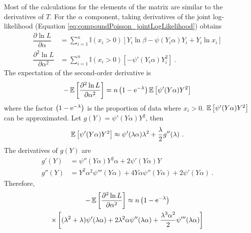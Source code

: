 Most of the calculations for the elements of the matrix are similar to the derivatives of $T$. For the $\alpha$ component, taking derivatives of the joint log-likelihood (Equation \eqref{eq:compoundPoisson_jointLogLikelihood}) obtains
\begin{align}
\dfrac{\partial\ln L}{\partial\alpha} &= \sum_{i=1}^n\mathbb{I}(x_i>0)
\left[
  Y_i\ln\beta - \psi(Y_i\alpha)Y_i+Y_i\ln x_i
\right]
\\
\dfrac{\partial^2\ln L}{\partial\alpha^2} &= \sum_{i=1}^n\mathbb{I}(x_i>0)
\left[
  -\psi'(Y_i\alpha)Y_i^2
\right] \ .
\end{align}
The expectation of the second-order derivative is
\begin{equation}
-\operatorname{\mathbb{E}}\left[\dfrac{\partial^2\ln L}{\partial\alpha^2}\right]
=
n\left(1-\mathrm{e}^{-\lambda}\right)
\operatorname{\mathbb{E}}\left[
  \psi'(Y\alpha)Y^2
\right]
\end{equation}
where the factor $\left(1-\mathrm{e}^{-\lambda}\right)$ is the proportion of data where $x_i>0$. $\operatorname{\mathbb{E}}\left[\psi'(Y\alpha)Y^2\right]$ can be approximated. Let $g(Y)=\psi'(Y\alpha)Y^2$, then
\begin{equation}
\operatorname{\mathbb{E}}\left[\psi'(Y\alpha)Y^2\right]
\approx
\psi'(\lambda\alpha)\lambda^2
+\dfrac{\lambda}{2}g''(\lambda) \ .
\end{equation}
The derivatives of $g(Y)$ are
\begin{align}
g'(Y)&=\psi''(Y\alpha)Y^2\alpha + 2\psi'(Y\alpha)Y
\\
g''(Y)&=Y^2\alpha^2\psi'''(Y\alpha)+4Y\alpha\psi''(Y\alpha)+2\psi'(Y\alpha)\ .
\end{align}
Therefore,
\begin{multline}
-\operatorname{\mathbb{E}}\left[\dfrac{\partial^2\ln L}{\partial\alpha^2}\right]\approx n\left(1-\mathrm{e}^{-\lambda}\right)
\\
\times\left[(\lambda^2+\lambda)\psi'(\lambda\alpha)+2\lambda^2\alpha\psi''(\lambda\alpha)+\dfrac{\lambda^3\alpha^2}{2}\psi'''(\lambda\alpha)\right]
\end{multline}

